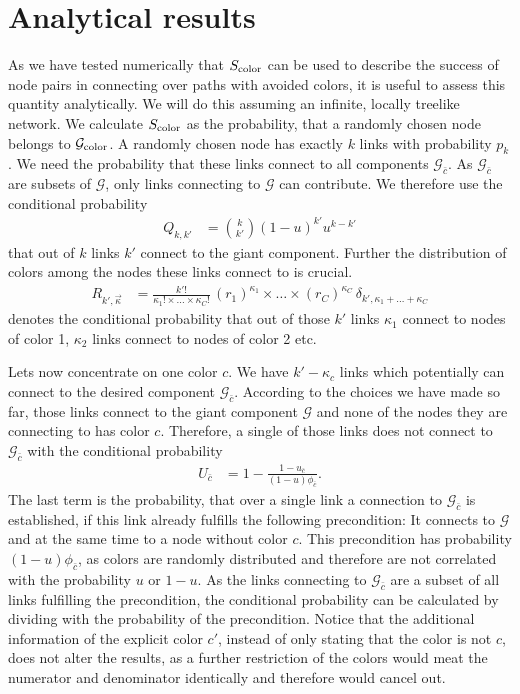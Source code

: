 \documentclass[aps, pre, onecolumn, a4paper, floatfix]{revtex4}
\begin{document}
\section*{Analytical results}

As we have tested numerically that $S_{\rm color}$ can be used to describe the success of node 
pairs in connecting over paths with avoided colors, it is useful to assess this quantity 
analytically. We will do this assuming an infinite, locally treelike network. 
We calculate $S_{\rm color}$ as the probability, that a randomly chosen node belongs to 
${\mathcal G}_{\rm color}$. A randomly chosen node has exactly $k$ links with probability $p_k$. We 
need the probability that these links connect to all components ${\mathcal G}_{\bar c}$. As 
${\mathcal G}_{\bar c}$ are subsets of ${\mathcal G}$, only links connecting to ${\mathcal G}$ 
can contribute. We therefore use the conditional probability
%
\begin{align}
Q_{k,k'} &={k \choose k'}(1-u)^{k'}u^{k-k'}
\end{align}
%
that out of $k$ links $k'$ connect to the giant component. Further the distribution of colors 
among the nodes these links connect to is crucial. 
%
\begin{align}
R_{k',\vec \kappa} &=\frac{k'!}{\kappa_1! \times \dots \times \kappa_C!} \,
(r_1)^{\kappa_1} \times \dots \times (r_C)^{\kappa_C}\,
\delta_{k',\kappa_1+\dots + \kappa_C}
\end{align}
%
denotes the conditional probability that out of those $k'$ links $\kappa_1$ connect to nodes of 
color 1, $\kappa_2$ links connect to nodes of color 2 etc. 

Lets now concentrate on one color $c$. We have 
$k'-\kappa_c$ links which potentially can connect to the desired component ${\mathcal G}_{\bar c}$. 
According to the choices we have made so far, those links connect to the giant component 
${\mathcal G}$ and none of the nodes they are connecting to has color $c$. Therefore, a single 
of those links does not connect 
to ${\mathcal G}_{\bar c}$ with the conditional probability 
%
\begin{align}
U_{\bar c} &= 1 - \frac{1-u_{\bar c}}{(1-u)\phi_{\bar c}}.
\end{align}
The last term is the probability, that over a single link a connection to ${\mathcal G}_{\bar c}$
is established, if this link already fulfills the following precondition: 
It connects to ${\mathcal G}$ and at the same time to a node without color $c$. 
This precondition has probability $(1-u)\phi_{\bar c}$, as colors are randomly distributed and therefore 
are not correlated with the probability $u$ or $1-u$. As the links connecting to ${\mathcal G}_{\bar c}$ 
are a subset of all links fulfilling the precondition, the conditional probability can be 
calculated by dividing with the probability of the precondition. 
Notice that the additional information of the explicit color $c'$, instead of only stating that the color 
is not $c$, does not alter the results, as a further restriction of the colors 
would meat the numerator and denominator identically and therefore would cancel out. 
\end{document}
